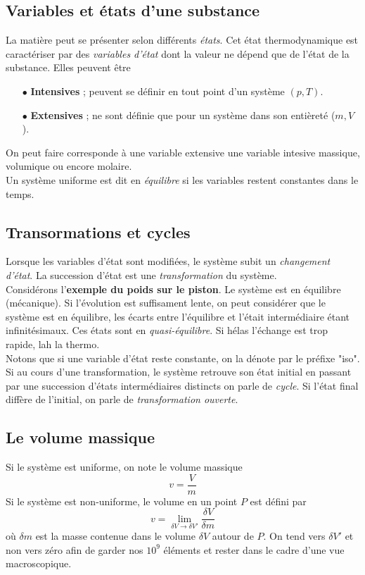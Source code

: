 	\subsection{Variables et états d'une substance}
	La matière peut se présenter selon différents \textit{états}. Cet 
	état thermodynamique est caractériser par des \textit{variables d'état} 
	dont la valeur ne dépend que de l'état de la substance. Elles peuvent 
	être
	\begin{itemize}
	\item[$\bullet$] \textbf{Intensives} ; peuvent se définir en tout point 
	d'un système $(p, T)$.
	\item[$\bullet$] \textbf{Extensives} ; ne sont définie que pour  un 
	système dans son entièreté ($m, V$).
	\end{itemize}
	On peut faire corresponde à une variable extensive une variable intesive 
	massique, volumique ou encore molaire.\\
	Un système uniforme est dit en \textit{équilibre} si les variables 
	restent constantes dans le temps.
	
	
	\subsection{Transormations et cycles}
	Lorsque les variables d'état sont modifiées, le système subit un \textit{
	changement d'état}. La succession d'état est une \textit{transformation} 
	du système. \\
	Considérons l'\textbf{exemple du poids sur le piston}. Le système est 
	en équilibre (mécanique). Si l'évolution est suffisament lente, on peut 
	considérer que le système est en équilibre, les écarts entre l'équilibre 
	et l'était intermédiaire étant infinitésimaux. Ces états sont en 
	\textit{quasi-équilibre}. Si hélas l'échange est trop rapide, lah la 
	thermo.\\
	Notons que si une variable d'état reste constante, on la dénote par le 
	préfixe "iso".\\
	
	Si au cours d'une transformation, le système retrouve son état initial en 
	passant par une succession d'états intermédiaires distincts on parle de 
	\textit{cycle}. Si l'état final diffère de l'initial, on parle de \textit{
	transformation ouverte}.
	
	
	\subsection{Le volume massique}
	Si le système est uniforme, on note le volume massique 
	\begin{equation}
	v = \frac{V}{m}
	\end{equation}
	Si le système est non-uniforme, le volume en un point $P$ est défini 
	par
	\begin{equation}
	v = \lim\limits_{\delta V \rightarrow \delta V'} \frac{\delta V}{
	\delta m}
	\end{equation}
	où $\delta m$ est la masse contenue dans le volume $\delta V$ autour 
	de $P$. On tend vers $\delta V'$ et non vers zéro afin de garder nos 
	$10^9$ éléments et rester dans le cadre d'une vue macroscopique.
	
